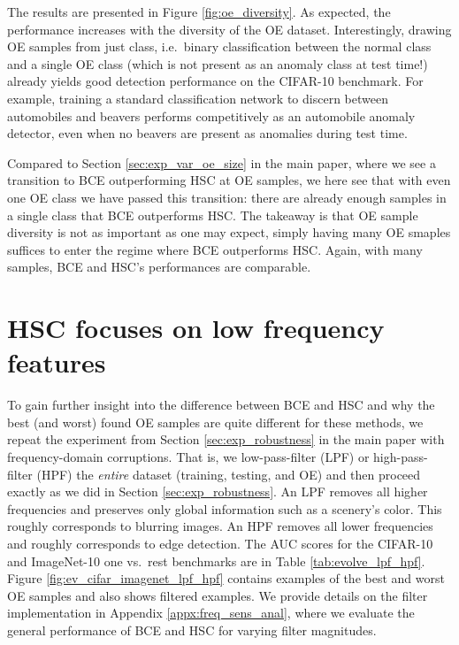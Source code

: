\documentclass[10pt]{article} \usepackage[accepted]{stylefiles/tmlr}
\begin{document}
The results are presented in Figure \ref{fig:oe_diversity}. 
As expected, the performance increases with the diversity of the OE dataset.
Interestingly, drawing OE samples from just  class, i.e.~binary classification between the normal class and a single OE class (which is not present as an anomaly class at test time!) already yields good detection performance on the CIFAR-10 benchmark. For example, training a standard classification network to discern between automobiles and beavers performs competitively as an automobile anomaly detector, even when no beavers are present as anomalies during test time.

Compared to Section \ref{sec:exp_var_oe_size} in the main paper, where we see a transition to BCE outperforming HSC at  OE samples, we here see that with even one OE class we have passed this transition: there are already enough samples in a single class that BCE outperforms HSC. The takeaway is that OE sample diversity is not as important as one may expect, simply having many OE smaples suffices to enter the regime where BCE outperforms HSC. Again, with many samples, BCE and HSC's performances are comparable. 








\section{HSC focuses on low frequency features}  \label{appx:exp_freq_anal}
To gain further insight into the difference between BCE and HSC and why the best (and worst) found OE samples are quite different for these methods, we repeat the experiment from Section \ref{sec:exp_robustness} in the main paper with frequency-domain corruptions. 
That is, we low-pass-filter (LPF) or high-pass-filter (HPF) the \emph{entire} dataset (training, testing, and OE) and then proceed exactly as we did in Section \ref{sec:exp_robustness}. 
An LPF removes all higher frequencies and preserves only global information such as a scenery's color. This roughly corresponds to blurring images.
An HPF removes all lower frequencies and roughly corresponds to edge detection.
The AUC scores for the CIFAR-10 and ImageNet-10 one vs.~rest benchmarks are in Table \ref{tab:evolve_lpf_hpf}.
Figure \ref{fig:ev_cifar_imagenet_lpf_hpf} contains examples of the best and worst OE samples and also shows filtered examples. 
We provide details on the filter implementation in Appendix \ref{appx:freq_sens_anal}, where we evaluate the general performance of BCE and HSC for varying filter magnitudes. 
\end{document}
